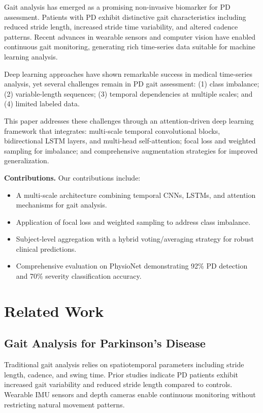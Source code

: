 \documentclass[conference]{IEEEtran}
\begin{document}
Gait analysis has emerged as a promising non-invasive biomarker for PD assessment. Patients with PD exhibit distinctive gait characteristics including reduced stride length, increased stride time variability, and altered cadence patterns. Recent advances in wearable sensors and computer vision have enabled continuous gait monitoring, generating rich time-series data suitable for machine learning analysis.

Deep learning approaches have shown remarkable success in medical time-series analysis, yet several challenges remain in PD gait assessment: (1) class imbalance; (2) variable-length sequences; (3) temporal dependencies at multiple scales; and (4) limited labeled data.

This paper addresses these challenges through an attention-driven deep learning framework that integrates: multi-scale temporal convolutional blocks, bidirectional LSTM layers, and multi-head self-attention; focal loss and weighted sampling for imbalance; and comprehensive augmentation strategies for improved generalization.

\textbf{Contributions.} Our contributions include:
\begin{itemize}
  \item A multi-scale architecture combining temporal CNNs, LSTMs, and attention mechanisms for gait analysis.
  \item Application of focal loss and weighted sampling to address class imbalance.
  \item Subject-level aggregation with a hybrid voting/averaging strategy for robust clinical predictions.
  \item Comprehensive evaluation on PhysioNet demonstrating 92\% PD detection and 70\% severity classification accuracy.
\end{itemize}

\section{Related Work}
\subsection{Gait Analysis for Parkinson's Disease}
Traditional gait analysis relies on spatiotemporal parameters including stride length, cadence, and swing time. Prior studies indicate PD patients exhibit increased gait variability and reduced stride length compared to controls. Wearable IMU sensors and depth cameras enable continuous monitoring without restricting natural movement patterns.
\end{document}
